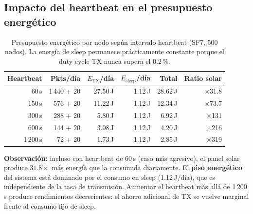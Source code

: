 \documentclass[12pt,letterpaper]{article}
\begin{document}
\subsection{Impacto del heartbeat en el presupuesto energético}

\begin{table}[H]
\centering
\caption{Presupuesto energético por nodo según intervalo heartbeat
  (SF7, 500 nodos). La energía de sleep permanece prácticamente constante
  porque el duty cycle TX nunca supera el 0.2\,\%.}
\label{tab:energy_heartbeat}
\begin{tabular}{rrrrrr}
\toprule
\textbf{Heartbeat} & \textbf{Pkts/día} & \textbf{$E_\text{TX}$/día} &
  \textbf{$E_\text{sleep}$/día} & \textbf{Total} & \textbf{Ratio solar} \\
\midrule
   60\,s & 1\,440 + 20 & 27.50\,J & 1.12\,J & 28.62\,J & $\times$31.8 \\
  150\,s &   576 + 20  & 11.22\,J & 1.12\,J & 12.34\,J & $\times$73.7 \\
  300\,s &   288 + 20  &  5.80\,J & 1.12\,J &  6.92\,J & $\times$131 \\
  600\,s &   144 + 20  &  3.08\,J & 1.12\,J &  4.20\,J & $\times$216 \\
1\,200\,s &  72 + 20  &  1.73\,J & 1.12\,J &  2.85\,J & $\times$319 \\
\bottomrule
\end{tabular}
\end{table}

\textbf{Observación:} incluso con heartbeat de 60\,s (caso más agresivo),
el panel solar produce $31.8\times$ más energía que la consumida
diariamente. El \textbf{piso energético} del sistema está dominado por
el consumo en sleep (1.12\,J/día), que es independiente de la tasa de
transmisión. Aumentar el heartbeat más allá de 1\,200\,s produce
rendimientos decrecientes: el ahorro adicional de TX se vuelve marginal
frente al consumo fijo de sleep.
\end{document}
